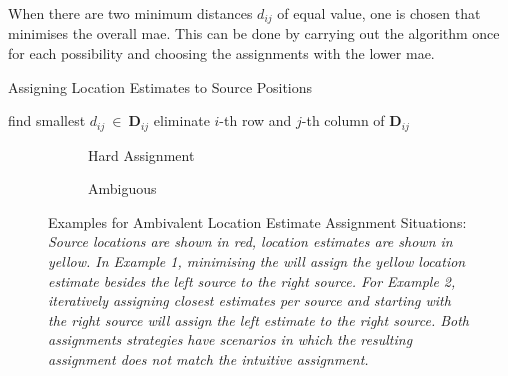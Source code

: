 When there are two minimum distances $d_{ij}$ of equal value, one is chosen that minimises the overall \gls{mae}. This can be done by carrying out the algorithm once for each possibility and choosing the assignments with the lower \gls{mae}.
\begin{algorithm}[!b]
\caption{Assigning Location Estimates to Source Positions}
\label{alg:assignment}
\begin{algorithmic}
    \State find smallest $d_{ij}\ \in\ \bm{D}_{ij}$ 
    \State eliminate $i$-th row and $j$-th column of $\bm{D}_{ij}$
    \EndWhile
\end{algorithmic}
\end{algorithm}

\begin{figure}[H]
%        
	\begin{subfigure}{0.49\textwidth}
	\centering
	     \footnotesize
        \setlength{\figurewidth}{0.8\textwidth}
        \setlength{\figureheight}{6cm}
        
		\caption{Hard Assignment}
	\end{subfigure}
	\begin{subfigure}{0.49\textwidth}
	\centering
		 \footnotesize
		 \setlength{\figurewidth}{0.8\textwidth}
        \setlength{\figureheight}{6cm}
        
		\caption{Ambiguous}
	\end{subfigure}
	\caption[Examples for Ambiguous Location Estimate Assignment Situations]{Examples for Ambivalent Location Estimate Assignment Situations: \itshape Source locations are shown in red, location estimates are shown in yellow. In Example 1, minimising the  will assign the yellow location estimate besides the left source to the right source. For Example 2, iteratively assigning closest estimates per source and starting with the right source will assign the left estimate to the right source. Both assignments strategies have scenarios in which the resulting assignment does not match the intuitive assignment.}
	\label{fig:assignmentExample}
\end{figure}

